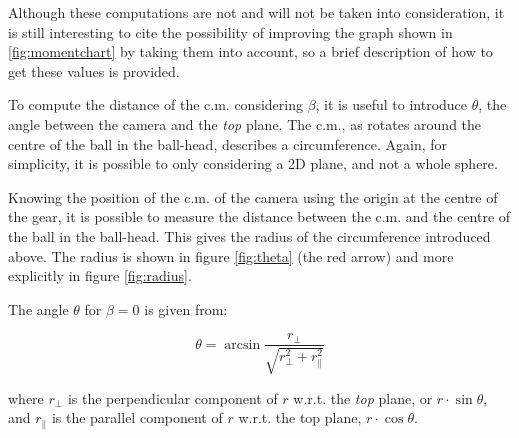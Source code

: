 \documentclass[]{article}
\begin{document}
Although these computations are not and will not be taken into consideration, it is still interesting to cite the possibility of improving the graph shown in \ref{fig:momentchart} by taking them into account, so a brief description of how to get these values is provided.

To compute the distance of the c.m. considering $\beta$, it is useful to introduce $\theta$, the angle between the camera and the \textit{top} plane. The c.m., as rotates around the centre of the ball in the ball-head, describes a circumference. Again, for simplicity, it is possible to only considering a 2D plane, and not a whole sphere. 

Knowing the position of the c.m. of the camera using the origin at the centre of the gear, it is possible to measure the distance between the c.m. and the centre of the ball in the ball-head. This gives the radius of the circumference introduced above. The radius is shown in figure \ref{fig:theta} (the red arrow) and more explicitly in figure \ref{fig:radius}.

The angle $\theta$ for $\beta = 0$ is given from:

$$\theta = \arcsin \frac{r_{\perp}}{\sqrt{r_{\perp}^2 + r_{\parallel}^2}} $$

where $r_{\perp}$ is the perpendicular component of $r$ w.r.t. the \textit{top} plane, or $r \cdot \sin \theta$, and $r_{\parallel}$ is the parallel component of $r$ w.r.t. the top plane, $r \cdot \cos \theta$. 
\end{document}
